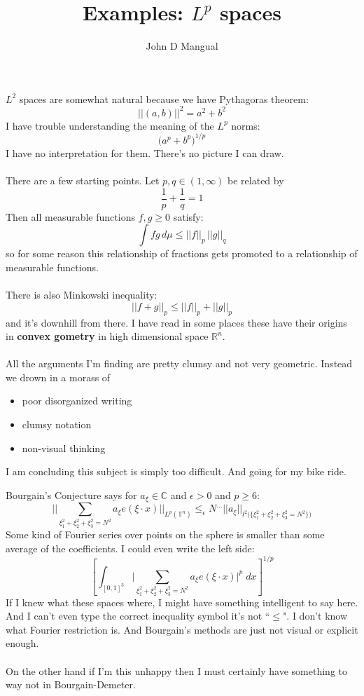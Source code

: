 \documentclass[12pt]{article}
\title{\textbf{ Examples:  $L^p$ spaces}}
\author{John D Mangual}
\date{}
\begin{document}
\selectfont \fontsize{25}{30}\selectfont

\maketitle

\noindent $L^2$ spaces are somewhat natural because we have Pythagoras theorem:
$$  \big|\big| (a,b)\big|\big|^2 = a^2 + b^2 $$
I have trouble understanding the meaning of the $L^p$ norms:
$$   \big( a^p + b^p \big)^{1/p}$$
I have no interpretation for them.  There's no picture I can draw.  \\ \\
There are a few starting points. Let $p,q \in (1, \infty)$ be related by
$$ \frac{1}{p} + \frac{1}{q}=1 $$
Then all measurable functions $f,g \geq 0$ satisfy:
$$ \int fg \, d\mu \leq \big|\big|f\big|\big|_p \, 
\big|\big|g\big|\big|_q $$
so for some reason this relationship of fractions gets promoted to a relationship of measurable functions. \\ \\
There is also Minkowski inequality:
$$ \big|\big| f + g \big|\big|_p \leq 
\big|\big| f  \big|\big|_p + 
\big|\big| g  \big|\big|_p $$
and it's downhill from there.  I have read in some places these have their origins in \textbf{convex gometry} in high dimensional space $\mathbb{R}^n$.  \\ \\
All the arguments I'm finding are pretty clumsy and not very geometric.  Instead we drown in a morass of
\begin{itemize}
\item poor disorganized writing
\item clumsy notation
\item non-visual thinking
\end{itemize}
I am concluding this subject is simply too difficult.  And going for my bike ride.

\newpage

\noindent Bourgain's Conjecture says for $a_\xi \in \mathbb{C}$ and $\epsilon > 0$ and $p \geq 6$:
$$
\big|\big| \sum_{\xi_1^2 +\xi_2^2 +\xi_3^2 =N^2 }
a_\xi e(\xi \cdot x) \big|\big|_{L^p(\mathbb{T}^n)}
\leq_\epsilon N^{\dots} \big|\big| a_\xi \big| \big|_{l^2\big(\{ \xi_1^2 + \xi_2^2 + \xi_3^2 = N^2 \}\big)}
 $$
 Some kind of Fourier series over points on the sphere is smaller than some average of the coefficients.  I could even write the left side:
 $$ \left[ \int_{[0,1]^3} \bigg|
 \sum_{\xi_1^2 +\xi_2^2 +\xi_3^2 =N^2 }
a_\xi e(\xi \cdot x) \bigg|^p \; dx
 \right]^{1/p}$$
 If I knew what these spaces where, I might have something intelligent to say here.  And I can't even type the correct inequality symbol it's not ``$\leq$". I don't know what Fourier restriction is.  And Bourgain's methods are just not visual or explicit enough. \\ \\
On the other hand if I'm this unhappy then I must certainly have something to way not in Bourgain-Demeter.
\end{document}
